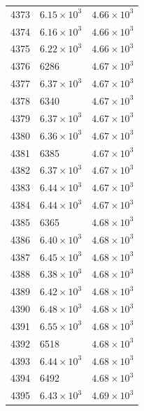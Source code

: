 \begin{table}[H]
\begin{tabular}{lll}
4373 & $\displaystyle 6.15 \times 10^{3}$ & $\displaystyle 4.66 \times 10^{3}$ \\
4374 & $\displaystyle 6.16 \times 10^{3}$ & $\displaystyle 4.66 \times 10^{3}$ \\
4375 & $\displaystyle 6.22 \times 10^{3}$ & $\displaystyle 4.66 \times 10^{3}$ \\
4376 & 6286 & $\displaystyle 4.67 \times 10^{3}$ \\
4377 & $\displaystyle 6.37 \times 10^{3}$ & $\displaystyle 4.67 \times 10^{3}$ \\
4378 & 6340 & $\displaystyle 4.67 \times 10^{3}$ \\
4379 & $\displaystyle 6.37 \times 10^{3}$ & $\displaystyle 4.67 \times 10^{3}$ \\
4380 & $\displaystyle 6.36 \times 10^{3}$ & $\displaystyle 4.67 \times 10^{3}$ \\
4381 & 6385 & $\displaystyle 4.67 \times 10^{3}$ \\
4382 & $\displaystyle 6.37 \times 10^{3}$ & $\displaystyle 4.67 \times 10^{3}$ \\
4383 & $\displaystyle 6.44 \times 10^{3}$ & $\displaystyle 4.67 \times 10^{3}$ \\
4384 & $\displaystyle 6.44 \times 10^{3}$ & $\displaystyle 4.67 \times 10^{3}$ \\
4385 & 6365 & $\displaystyle 4.68 \times 10^{3}$ \\
4386 & $\displaystyle 6.40 \times 10^{3}$ & $\displaystyle 4.68 \times 10^{3}$ \\
4387 & $\displaystyle 6.45 \times 10^{3}$ & $\displaystyle 4.68 \times 10^{3}$ \\
4388 & $\displaystyle 6.38 \times 10^{3}$ & $\displaystyle 4.68 \times 10^{3}$ \\
4389 & $\displaystyle 6.42 \times 10^{3}$ & $\displaystyle 4.68 \times 10^{3}$ \\
4390 & $\displaystyle 6.48 \times 10^{3}$ & $\displaystyle 4.68 \times 10^{3}$ \\
4391 & $\displaystyle 6.55 \times 10^{3}$ & $\displaystyle 4.68 \times 10^{3}$ \\
4392 & 6518 & $\displaystyle 4.68 \times 10^{3}$ \\
4393 & $\displaystyle 6.44 \times 10^{3}$ & $\displaystyle 4.68 \times 10^{3}$ \\
4394 & 6492 & $\displaystyle 4.68 \times 10^{3}$ \\
4395 & $\displaystyle 6.43 \times 10^{3}$ & $\displaystyle 4.69 \times 10^{3}$ \\

\end{tabular}
\end{table}
